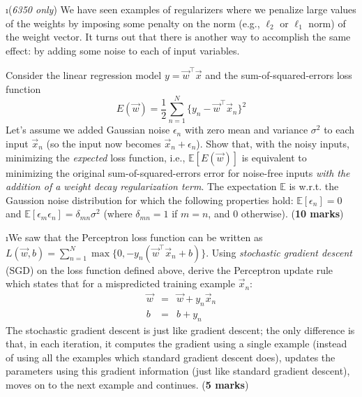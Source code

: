 \documentclass[fleqn]{article}
\begin{document}
\i (\textit{6350 only}) We have seen examples of regularizers
where we penalize large values of the weights by imposing 
some penalty on the norm (e.g., $\ell_2$ or $\ell_1$ norm) 
of the weight vector. It turns out that there is another way to 
accomplish the same effect: by adding some noise to each of input
variables.

Consider the linear regression model 
$y = \vec{w}^\top \vec{x}$ and the sum-of-squared-errors loss 
function 
\[
 E(\vec{w}) = \frac{1}{2}\sum_{n=1}^N \{y_n - \vec{w}^\top \vec{x}_n\}^2
\]
Let's assume we added Gaussian noise $\epsilon_n$ with zero mean
and variance $\sigma^2$ to each input $\vec{x}_n$ (so the input now
becomes $\vec{x}_n + \epsilon_n$). Show that, with the noisy inputs, 
minimizing the \textit{expected} loss function, i.e., $\mathbb{E}[E(\vec{w})]$ 
is equivalent to minimizing the original sum-of-squared-errors error for 
noise-free inputs \textit{with the addition of a weight decay regularization term}. 
The expectation $\mathbb{E}$ is w.r.t. the Gaussion noise distribution 
for which the following properties hold: $\mathbb{E}[\epsilon_n] = 0$ 
and $\mathbb{E}[\epsilon_m\epsilon_n] = \delta_{mn}\sigma^2$ (where 
$\delta_{mn}=1$ if $m=n$, and 0 otherwise). (\textbf{10 marks})

\i We saw that the Perceptron loss function can be written
as $L(\vec{w},b) = \sum_{n=1}^N \max\{0,-y_n(\vec{w}^\top\vec{x}_n+b)\}$. 
Using \textit{stochastic gradient descent} (SGD) on the loss function 
defined above, derive the Perceptron update rule which states that 
for a mispredicted training example $\vec{x}_n$:
\begin{eqnarray}
 \vec{w} &=& \vec{w} + y_n \vec{x}_n \nonumber \\
  b &=& b + y_n \nonumber
\end{eqnarray}
The stochastic gradient descent is just like gradient descent; the only 
difference is that, in each iteration, it computes the gradient using a 
single example (instead of using all the examples which standard gradient
descent does), updates the parameters using this gradient information 
(just like standard gradient descent), moves on to the next example and 
continues. (\textbf{5 marks})
\end{document}
